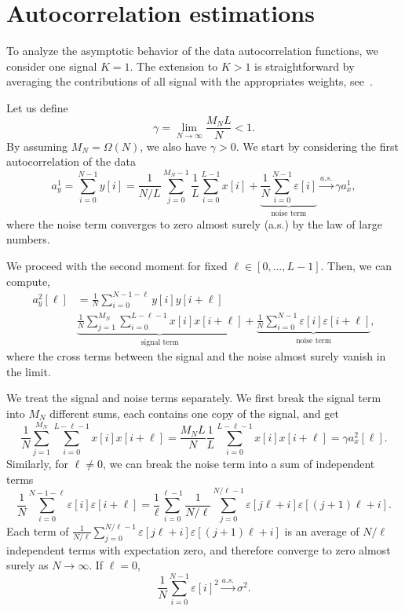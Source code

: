 \documentclass[english]{article}
\numberwithin{equation}{section}
\theoremstyle{plain}
\theoremstyle{definition}
\theoremstyle{remark}
\theoremstyle{plain}
\theoremstyle{remark}
\theoremstyle{plain}
\theoremstyle{plain}
\begin{document}
\section{Autocorrelation estimations} \label{sec:autocorrelation_computation}
 
To analyze the asymptotic behavior of the data autocorrelation functions, we consider one signal $K=1$. The extension to $K>1$ is straightforward by averaging the contributions of all signal with the appropriates weights, see~\cite{boumal2017heterogeneous}. 

Let us define
\begin{equation}
\gamma = \lim_{N\to\infty} \frac{M_NL}{N}<1.
\end{equation}
By assuming $M_N=\Omega(N)$, we also have $\gamma>0$.
We start by considering the first autocorrelation of the data
\begin{equation}
a_y^1 = \sum_{i=0}^{N-1} y[i] = \frac{1}{N/L}\sum_{j=0}^{M_N-1}\frac{1}{L}\sum_{i=0}^{L-1}x[i] + \underbrace{\frac{1}{N}\sum_{i=0}^{N-1}\varepsilon[i]}_{\text{noise term}} \xrightarrow{a.s.}\gamma a_x^1,
\end{equation}
where the noise term converges to zero almost surely (a.s.) by the law of large numbers.

We proceed with the second moment for fixed $\ell\in[0,\ldots,L-1]$. Then, we can compute, 
\begin{equation}
\begin{split}
a_y^2[\ell] & = \frac{1}{N}\sum_{i=0}^{N-1-\ell}y[i]y[i+\ell] \\
& \underbrace{\frac{1}{N}\sum_{j=1}^{M_N}\sum_{i=0}^{L-\ell-1}x[i]x[i+\ell]}_{\text{signal term}} + \underbrace{\frac{1}{N}\sum_{i=0}^{N-1}\varepsilon[i]\varepsilon[i+\ell]}_{\text{noise term}},
\end{split}
\end{equation}
where the cross terms between the signal and the noise almost surely vanish in the limit. 

We treat the signal and noise terms separately. We first break the signal term into $M_N$ different sums, each contains one copy of the signal, and get
\begin{equation} \label{eq:2nd_moment_signal_term}
\frac{1}{N}\sum_{j=1}^{M_N}\sum_{i=0}^{L-\ell-1}x[i]x[i+\ell] = \frac{M_NL}{N}\frac{1}{L}\sum_{i=0}^{L-\ell-1}x[i]x[i+\ell] = \gamma a_x^2[\ell].
\end{equation}
Similarly, for $\ell\neq 0$, we can break the noise term into a sum of independent terms 
\begin{equation}
\frac{1}{N}\sum_{i=0}^{N-1-\ell} \varepsilon[i]\varepsilon[i+\ell] = \frac{1}{\ell}\sum_{i=0}^{\ell-1}\frac{1}{N/\ell}\sum_{j=0}^{N/\ell -1} \varepsilon[j\ell + i] \varepsilon[(j+1)\ell + i].
\end{equation}
Each term of $\frac{1}{N/\ell}\sum_{j=0}^{N/\ell -1} \varepsilon[j\ell + i] \varepsilon[(j+1)\ell + i]$ is an average of $N/\ell$ independent terms with expectation zero, and therefore converge to zero almost surely as $N\to\infty$.
If $\ell=0$, 
\begin{equation}
\frac{1}{N}\sum_{i=0}^{N-1} \varepsilon[i]^2 \xrightarrow{a.s.} \sigma^2.
\end{equation}
\end{document}
